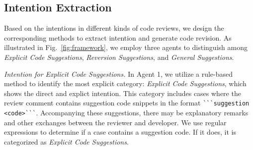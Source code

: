 


\subsection{Intention Extraction}




Based on the intentions in different kinds of code reviews, we design the corresponding methods to extract intention and generate code revision. As illustrated in Fig.~\ref{fig:framework}, we employ three agents to distinguish among \textit{Explicit Code Suggestions}, \textit{Reversion Suggestions}, and \textit{General Suggestions}.

\textit{Intention for Explicit Code Suggestions.} In Agent 1, we utilize a rule-based method to identify the most explicit category: \textit{Explicit Code Suggestions}, which shows the direct and explict intention. 
This category includes cases where the review comment contains suggestion code snippets in the format \verb|```suggestion <code>```|. Accompanying these suggestions, there may be explanatory remarks and other exchanges between the reviewer and developer. We use regular expressions to determine if a case contains a suggestion code. If it does, it is categorized as \textit{Explicit Code Suggestions}.



